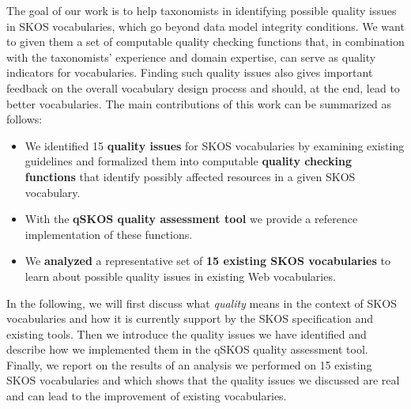 
The goal of our work is to help taxonomists in identifying possible quality issues in SKOS vocabularies, which go beyond data model integrity conditions. We want to given them a set of computable quality checking functions that, in combination with the taxonomists' experience and domain expertise, can serve as quality indicators for vocabularies. Finding such quality issues also gives important feedback on the overall vocabulary design process and should, at the end, lead to better vocabularies. The main contributions of this work can be summarized as follows:

\begin{itemize}

	\item We identified 15 \textbf{quality issues} for SKOS vocabularies by examining existing guidelines and formalized them into computable \textbf{quality checking functions} that identify possibly affected resources in a given SKOS vocabulary.
	
	\item With the \textbf{qSKOS quality assessment tool} we provide a reference implementation of these functions.

	\item We \textbf{analyzed} a representative set of \textbf{15 existing SKOS vocabularies} to learn about possible quality issues in existing Web vocabularies.

\end{itemize}

In the following, we will first discuss what \emph{quality} means in the context of SKOS vocabularies and how it is currently support by the SKOS specification and existing tools. Then we introduce the quality issues we have identified and describe how we implemented them in the qSKOS quality assessment tool. Finally, we report on the results of an analysis we performed on 15 existing SKOS vocabularies and which shows that the quality issues we discussed are real and can lead to the improvement of existing vocabularies.